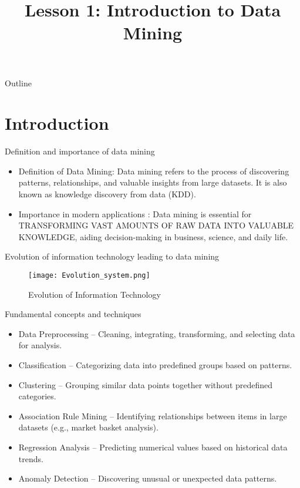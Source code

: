 \documentclass{beamer}
\title{Lesson 1: Introduction to Data Mining}
\author{}
\date{}
\begin{document}
{
\begin{frame}
    \titlepage
\end{frame}
}
\begin{frame}{Outline}
    \tableofcontents
\end{frame}

\section{Introduction}
\begin{frame}{Definition and importance of data mining}
    \begin{itemize}
        \item Definition of Data Mining: Data mining refers to the process of discovering patterns, relationships, and valuable insights from large datasets. It is also known as knowledge discovery from data (KDD).
        \item Importance in modern applications : Data mining is essential for \MakeUppercase{transforming vast amounts of raw data into valuable knowledge}, aiding decision-making in business, science, and daily life.
    \end{itemize}
\end{frame}

\begin{frame}{Evolution of information technology leading to data mining}
    \begin{figure}
        \centering
        \texttt{[image: Evolution\_system.png]}
        \caption{Evolution of Information Technology}
    \end{figure}
\end{frame}

\begin{frame}{Fundamental concepts and techniques}
    \begin{itemize}
        \item Data Preprocessing – Cleaning, integrating, transforming, and selecting data for analysis.
        \item Classification – Categorizing data into predefined groups based on patterns.
        \item Clustering – Grouping similar data points together without predefined categories.
        \item Association Rule Mining – Identifying relationships between items in large datasets (e.g., market basket analysis).
        \item Regression Analysis – Predicting numerical values based on historical data trends.
        \item Anomaly Detection – Discovering unusual or unexpected data patterns.
  \end{itemize}
\end{frame}
\end{document}
